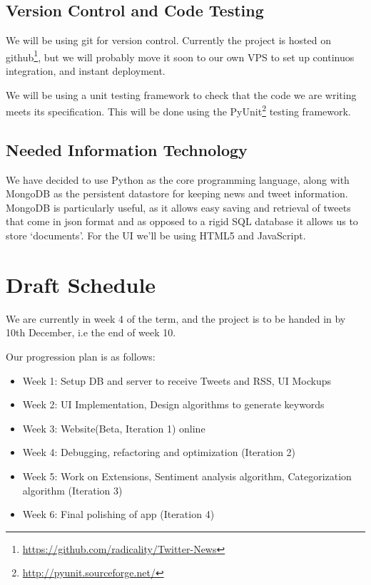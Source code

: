 \documentclass[a4paper,11pt]{article}
\begin{document}
	
		\subsection{Version Control and Code Testing}
		
			We will be using git for version control. Currently the project is hosted on github\footnote{\url{https://github.com/radicality/Twitter-News}}, but we will probably move it soon to our own VPS to set up continuos integration, and instant deployment.
			
			We will be using a unit testing framework to check that the code we are writing meets its specification. This will be done using the PyUnit\footnote{\url{http://pyunit.sourceforge.net/}} testing framework.
			
			
		\subsection{Needed Information Technology}
			We have decided to use Python as the core programming language, along with MongoDB as the persistent datastore for keeping news and tweet information. MongoDB is particularly useful, as it allows easy saving and retrieval of tweets that come in json format and as opposed to a rigid SQL database it allows us to store `documents'. For the UI we'll be using HTML5 and JavaScript.
			
	
	\section{Draft Schedule}
	
		We are currently in week 4 of the term, and the project is to be handed in by 10th December, i.e the end of week 10.
		
		Our progression plan is as follows:
		
		\begin{itemize}
			\item Week 1: Setup DB and server to receive Tweets and RSS, UI Mockups
			\item Week 2: UI Implementation, Design algorithms to generate keywords
			\item Week 3: Website(Beta, Iteration 1) online
			\item Week 4: Debugging, refactoring and optimization (Iteration 2)
			\item Week 5: Work on Extensions, Sentiment analysis algorithm, Categorization algorithm (Iteration 3)
			\item Week 6: Final polishing of app (Iteration 4)
		\end{itemize}
	
\end{document}

